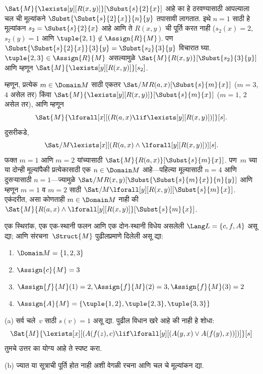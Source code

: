 \begin{ex}
$\Sat{M}{\lexists[y][R(x,y)]}[\Subst{s}{2}{x}]$ आहे का हे ठरवण्यासाठी
आपल्याला चल ची मूल्यांकने
$\Subst{\Subst{s}{2}{x}}{n}{y}$ तपासावी लागतात. इथे $n = 1$ साठी हे
मूल्यांकन $s_2 = \Subst{s}{2}{x}$ आहे आणि ते $R(x,y)$ ची पूर्ति करत
नाही ($s_2(x) = 2$, $s_2(y) = 1$ आणि
$\tuple{2,1}\notin \Assign{R}{M}$). पण
$\Subst{\Subst{s}{2}{x}}{3}{y} = \Subst{s_2}{3}{y}$ विचारात घ्या.
$\tuple{2,3} \in \Assign{R}{M}$ असल्यामुळे
$\Sat{M}{R(x,y)}[\Subst{s_2}{3}{y}]$ आणि म्हणून
$\Sat{M}{\lexists[y][R(x,y)]}[s_2]$.

म्हणून, प्रत्येक $m \in \Domain M$ साठी एकतर
$\Sat/{M}{R(a,x)}[\Subst{s}{m}{x}]$ ($m = 3$, $4$ असेल तर) किंवा
$\Sat{M}{\lexists[y][R(x,y)]}[\Subst{s}{m}{x}]$ ($m = 1$, $2$ असेल तर),
आणि म्हणून
\[\Sat{M}{\lforall[x][(R(a,x) \lif \lexists[y][R(x,y)])]}[s].
\]
दुसरीकडे,
\[\Sat/{M}{\lexists[x][(R(a,x) \land \lforall[y][R(x,y)])]}[s].
\]
फक्त $m = 1$ आणि $m = 2$ यांच्यासाठी
$\Sat{M}{R(a,x)}[\Subst{s}{m}{x}]$. पण~$m$ च्या या दोन्ही मूल्यांपैकी
प्रत्येकासाठी एक $n \in \Domain M$ आहे---पहिल्या मूल्यासाठी $n = 4$
आणि दुसऱ्यासाठी $n = 1$---ज्यामुळे
$\Sat/{M}{R(x,y)}[\Subst{\Subst{s}{m}{x}}{n}{y}]$ आणि म्हणून $m = 1$
व $m = 2$ साठी
$\Sat/{M}{\lforall[y][R(x,y)]}[\Subst{s}{m}{x}]$. एकंदरीत, असा कोणताही
$m \in \Domain M$ नाही की
$\Sat{M}{R(a,x) \land \lforall[y][R(x,y)]}[\Subst{s}{m}{x}]$.


\end{ex}









\begin{prob}
एक स्थिरांक, एक एक-स्थानी फलन आणि एक दोन-स्थानी
विधेय असलेली $\Lang L = \{c, f, A\}$ असू द्या; आणि
संरचना~$\Struct{M}$ पुढीलप्रमाणे दिलेली असू द्या:
\begin{enumerate}
\item $\Domain M = \{1, 2, 3\}$
\item $\Assign{c}{M} = 3$
\item $\Assign{f}{M}(1) = 2, \Assign{f}{M}(2) = 3, \Assign{f}{M}(3) = 2$
\item $\Assign{A}{M} = \{\tuple{1, 2}, \tuple{2, 3}, \tuple{3, 3}\}$
\end{enumerate}
(a) सर्व चले~$v$ साठी $s(v) = 1$ असू द्या. पुढील विधान
खरे आहे की नाही हे शोधा:
\[\Sat{M}{\lexists[x][(A(f(z), c) \lif \lforall[y][(A(y, x) \lor A(f(y),
      x))])]}[s]
\]
तुमचे उत्तर का योग्य आहे ते स्पष्ट करा.

(b) ज्यात या सूत्राची पूर्ति होत नाही अशी वेगळी रचना आणि
चल चे मूल्यांकन द्या.
\end{prob}












